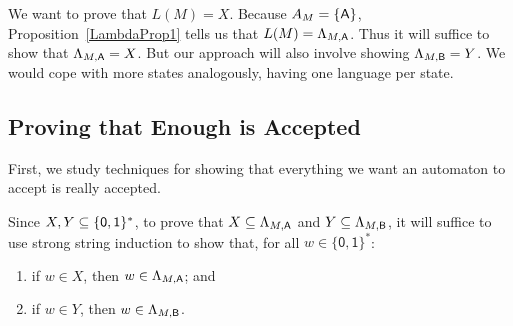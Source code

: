 We want to prove that $L(M) = X$.  Because $A_M=\{\mathsf{A}\}$,
Proposition~\ref{LambdaProp1} tells us that $L(M)=\Lambda_{M,\mathsf{A}}$.
Thus it will suffice to show that $\Lambda_{M,\mathsf{A}} = X$.  But our
approach will also involve showing $\Lambda_{M,\mathsf{B}} = Y$.  We would
cope with more states analogously, having one language per state.

\subsection{Proving that Enough is Accepted}

First, we study techniques for showing that everything we want an
automaton to accept is really accepted.

Since $X,Y\subseteq\{\mathsf{0,1}\}^*$, to prove that
$X\subseteq\Lambda_{M,\mathsf{A}}$ and $Y\subseteq\Lambda_{M,\mathsf{B}}$, it will suffice
to use strong string induction to show that, for all
$w\in\mathsf{\{0,1\}^*}$:
\begin{enumerate}[\quad(A)]
\item if $w\in X$, then $w\in\Lambda_{M,\mathsf{A}}$; and

\item if $w\in Y$, then $w\in\Lambda_{M,\mathsf{B}}$.
\end{enumerate}

